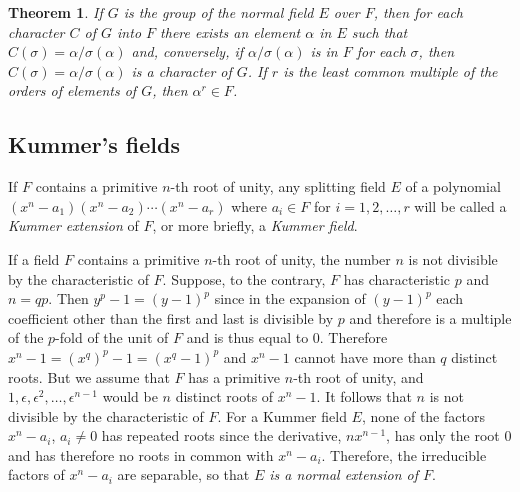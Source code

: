 \documentclass[10pt,leqno]{article}
\newtheorem{theo}{Theorem}
\theoremstyle{definition}
\begin{document}
\begin{theo}
\label{theo:22}
If $G$ is the group of the normal field $E$ over $F$, then for each character $C$ of $G$ into $F$ there exists an element $\alpha$ in $E$ such that $C(\sigma) = \alpha / \sigma(\alpha)$ and, conversely, if $\alpha / \sigma(\alpha)$ is in $F$ for each $\sigma$, then $C(\sigma) = \alpha/\sigma(\alpha)$ is a character of $G$.
If $r$ is the least common multiple of the orders of elements of $G$, then $\alpha^r \in F$.
\end{theo}



\subsection{Kummer's fields}

If $F$ contains a primitive $n$-th root of unity, any splitting field $E$ of a polynomial $(x^n - a_1)(x^n - a_2) \cdots (x^n - a_r)$ where $a_i \in F$ for $i = 1,2,\ldots,r$ will be called a \emph{Kummer extension} of $F$, or more briefly, a \emph{Kummer field}.


If a field $F$ contains a primitive $n$-th root of unity, the number $n$ is not divisible by the characteristic of $F$.
Suppose, to the contrary, $F$ has characteristic $p$ and $n = qp$.
Then $y^p - 1 = (y-1)^p$ since in the expansion of $(y-1)^p$ each coefficient other than the first and last is divisible by $p$ and therefore is a multiple of the $p$-fold of the unit of $F$ and is thus equal to $0$.
Therefore $x^n - 1 = (x^q)^p - 1 = (x^q - 1)^p$ and $x^n - 1$ cannot have more than $q$ distinct roots.
But we assume that $F$ has a primitive $n$-th root of unity, and $1, \epsilon, \epsilon^2, \ldots, \epsilon^{n-1}$ would be $n$ distinct roots of $x^n - 1$.
It follows that $n$ is not divisible by the characteristic of $F$.
For a Kummer field $E$, none of the factors $x^n - a_i$, $a_i \not= 0$ has repeated roots since the derivative, $n x^{n-1}$, has only the root $0$ and has therefore no roots in common with $x^n - a_i$.
Therefore, the irreducible factors of $x^n - a_i$ are separable, so that \emph{$E$ is a normal extension of $F$}.
\end{document}
